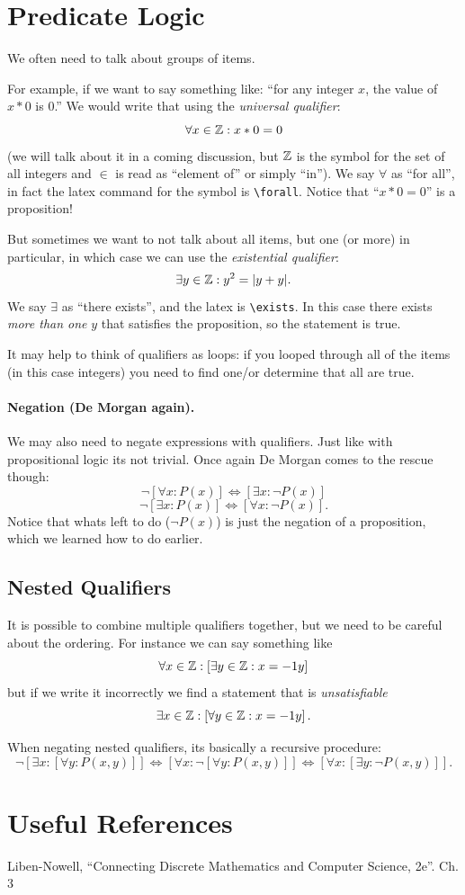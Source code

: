 \section{Predicate Logic}
We often need to talk about groups of items.

For example, if we want to say something like:
``for any integer $x$, the value of $x * 0$ is $0$.''
We would write that using the \emph{universal qualifier}:
\[\forall x\in\operatorname{\mathbb{Z}} : x*0 = 0\]
(we will talk about it in a coming discussion, but $\operatorname{\mathbb{Z}}$ is the symbol for the set of all integers and $\in$ is read as ``element of'' or simply ``in'').
We say $\forall$ as ``for all'', in fact the latex command for the symbol is \texttt{\textbackslash{}forall}.
Notice that ``$x*0 = 0$'' is a proposition!

But sometimes we want to not talk about all items, but one (or more) in particular, in which case we can use the \emph{existential qualifier}:
\[\exists y\in\operatorname{\mathbb{Z}}: y^2 = |y+y|.\]
We say $\exists$ as ``there exists'', and the latex is \texttt{\textbackslash{}exists}. 
In this case there exists \textit{more than one} $y$ that satisfies the proposition, so the statement is true.

It may help to think of qualifiers as loops: 
if you looped through all of the items (in this case integers) you need to find one/or determine that all are true. 

\paragraph{Negation (De Morgan again).}
 We may also need to negate expressions with qualifiers. 
 Just like with propositional logic its not trivial. 
 Once again De Morgan comes to the rescue though: 
 \[\neg \left[\forall x : P(x)\right] \iff \left[\exists x : \neg P(x)\right]\]
 \[\neg \left[\exists x : P(x)\right] \iff \left[\forall x : \neg P(x)\right].\]
 Notice that whats left to do ($\neg P(x)$) is just the negation of a proposition, which we learned how to do earlier. 

 \subsection{Nested Qualifiers}
 It is possible to combine multiple qualifiers together, but we need to be careful about the ordering. 
 For instance we can say something like 
 \[
 \forall x \in \operatorname{\mathbb{Z}} : \left[\exists y \in \operatorname{\mathbb{Z}} : x = -1 y\right]
 \]
 but if we write it incorrectly we find a statement that is \emph{unsatisfiable}
  \[
 \exists x \in \operatorname{\mathbb{Z}} : \left[\forall y \in \operatorname{\mathbb{Z}} : x = -1 y\right].
 \]
 
 When negating nested qualifiers, its basically a recursive procedure: 
  \[\neg \left[\exists x : \left[ \forall y: P(x,y)\right]\right] \iff \left[\forall x : \neg\left[ \forall y: P(x,y)\right]\right] \iff \left[\forall x : \left[ \exists y: \neg P(x,y)\right]\right].\]
  
\section*{Useful References}
Liben-Nowell, ``Connecting Discrete Mathematics and Computer Science, 2e''. Ch. 3 

